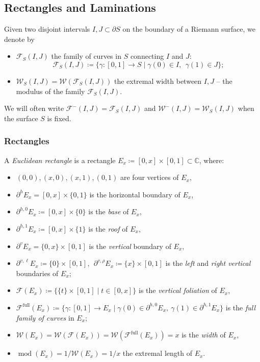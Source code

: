 \documentclass{amsart}
\renewcommand{\sp}{{\ \ }}
\newcommand{\1}{{\mathbb 1 }}
\newcommand{\Fam}{{\mathcal F}}
\newcommand{\Width}{{\mathcal W}}
\newcommand\full{{\operatorname{full}}}
\newcommand{\C}{\mathbb{C}}
\theoremstyle{remark}
\numberwithin{equation}{section}
\theoremstyle{definition}
\renewcommand{\mod}{\operatorname{mod}}
\begin{document}
\subsection{Rectangles and Laminations}
Given two disjoint intervals $I,J\subset \partial S$ on the boundary of a Riemann surface, we denote by 
\begin{itemize}
\item $\Fam_S(I,J)$ the family of curves in $S$ connecting $I$ and $J$:
\begin{equation}
\label{eq:Fam I J}
 \Fam_S(I,J)\coloneqq \{\gamma\colon[0,1]\to S\mid \gamma(0) \in I, \sp \gamma(1)\in J\};
\end{equation}
\item $\Width_S(I,J)=\Width(\Fam_S(I,J))$ the extremal width between $I,J$ -- the modulus of the family $\Fam_S(I,J)$.
\end{itemize}
We will often write $\Fam^-(I,J)=\Fam_S(I,J)$ and $\Width^-(I,J)=\Width_S(I,J)$ when the surface $S$ is fixed. 

\subsubsection{Rectangles}
\label{sss:Rectan} A \emph{Euclidean rectangle} is a rectangle $E_x\coloneqq[0,x]\times [0,1] \subset \C$, where:
\begin{itemize}
\item $(0,0), (x,0), (x,1), (0,1)$ are four vertices of $E_x$,
\item $\partial^h E_x=[0,x]\times\{0,1\}$ is the horizontal boundary of $E_x$,
\item $\partial^{h,0} E_x\coloneqq [0,x]\times\{0\}$ is the \emph{base} of $E_x$,
\item $\partial^{h,1} E_x\coloneqq [0,x]\times\{1\}$ is the \emph{roof} of $E_x$,
\item $\partial^v E_x=\{0,x\}\times [0,1]$ is the \emph{vertical} boundary of $E_x$,
\item $\partial^{v,\ell} E_x\coloneqq \{0\}\times [0,1], \sp  \partial^{v,\rho} E_x\coloneqq \{x\}\times [0,1]$ is the \emph{left} and \emph{right vertical} boundaries of $E_x$; 
\item $\Fam(E_x)\coloneqq \{\{t\}\times[0,1]\mid t\in [0,x]\}$ is the \emph{vertical foliation} of $E_x$,
\item $\Fam^\full(E_x)\coloneqq \{\gamma\colon [0,1]\to E_x \mid \gamma(0)\in \partial ^{h,0}E_x,\ \gamma(1)\in \partial ^{h,1}E_x \}$ is the \emph{full family of curves} in $E_x$; 
\item $\Width(E_x)=\Width(\Fam(E_x))=\Width(\Fam^\full(E_x))=x$ is the \emph{width} of $E_x$,
\item $\mod (E_x)=1/\Width(E_x)=1/x$ the extremal length of $E_x$.
\end{itemize}
\end{document}
